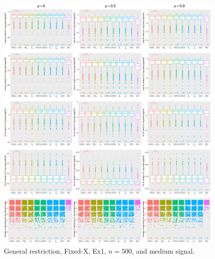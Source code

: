 \clearpage
\begin{figure}[!ht]
\centering
\includegraphics[width=\textwidth]{figures/supplement/fixedx/general_restriction/Ex1_n500_msnr.eps}
\caption{General restriction, Fixed-X, Ex1, $n=500$, and medium signal.}
\end{figure}
\clearpage

